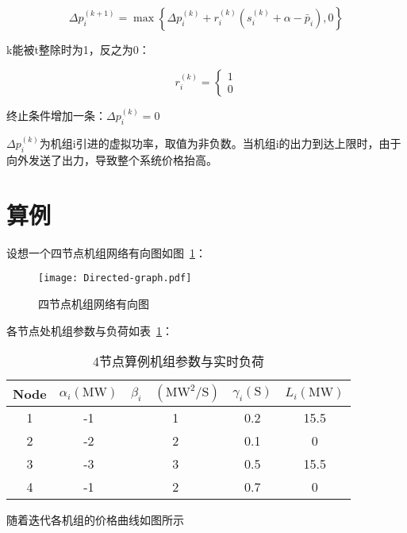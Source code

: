 \begin{equation}
    \Delta p_{i}^{(k+1)}=\max \left\{\Delta p_{i}^{(k)}+r_{i}^{(k)}\left(s_{i}^{(k)}+\alpha-\bar{p}_{i}\right), 0\right\}
\end{equation}

k能被t整除时为1，反之为0：

\begin{equation}
    r_{i}^{(k)}=\left\{\begin{array}{l}
    {1} \\
    {0}
    \end{array}\right.
\end{equation}


终止条件增加一条：$\Delta p_{i}^{(k)}=0$

$\Delta p_{i}^{(k)}$为机组i引进的虚拟功率，取值为非负数。当机组i的出力到达上限时，由于向外发送了出力，导致整个系统价格抬高。


\section{算例}

设想一个四节点机组网络有向图如图~\ref{fig:Directed-graph}：

\begin{figure}[htbp] %
    \centering
    \texttt{[image: Directed-graph.pdf]}
    \caption{四节点机组网络有向图}
    \label{fig:Directed-graph}
\end{figure}

各节点处机组参数与负荷如表~\ref{tab:example}：

\begin{table}[]
    \centering
    \begin{tabular}{@{}ccccc@{}}
    \toprule
    \multicolumn{1}{c}{Node} & $\alpha_{i}(\mathrm{MW})$  & $\beta_{i} \quad\left(\mathrm{MW}^{2} / \mathrm{S}\right)$ & $\gamma_{i}(\mathrm{S})$   & $L_{i}(\mathrm{MW})$    \\ \midrule
    1                        & -1 & 1 & 0.2 & 15.5 \\
    2                        & -2 & 2 & 0.1 & 0    \\
    3                        & -3 & 3 & 0.5 & 15.5 \\
    4                        & -1 & 2 & 0.7 & 0    \\ \bottomrule
    \end{tabular}
    \caption{4节点算例机组参数与实时负荷}
    \label{tab:example}
\end{table}

随着迭代各机组的价格曲线如图所示